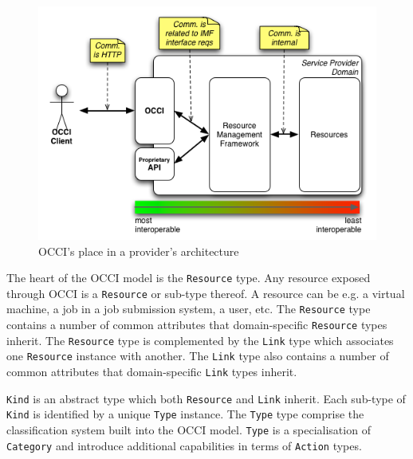 \documentclass[10pt,a4paper,british]{article}
\newcommand{\hl}{\texttt}
\begin{document}
\begin{figure}[!hp]
	\centering
	\includegraphics[scale=0.5]{figs/occi-intro.png}
	\caption{OCCI's place in a provider's architecture}
	\label{fig:placement}
\end{figure}

The heart of the OCCI model is the \hl{Resource} type. Any resource exposed
through OCCI is a \hl{Resource} or sub-type thereof.
A resource can be e.g. a virtual machine, a job in a job submission system, a
user, etc.
%
The \hl{Resource} type contains a number of common attributes that
domain-specific \hl{Resource} types inherit. The \hl{Resource} type is
complemented by the \hl{Link} type which associates one \hl{Resource} instance
with another.
%
The \hl{Link} type also contains a number of common attributes that
domain-specific \hl{Link} types inherit.

\hl{Kind} is an abstract type which both \hl{Resource} and \hl{Link} inherit.
Each sub-type of \hl{Kind} is identified by a unique \hl{Type} instance.
%
The \hl{Type} type comprise the classification system built into the OCCI
model. \hl{Type} is a specialisation of \hl{Category} and introduce additional
capabilities in terms of \hl{Action} types.
\end{document}
